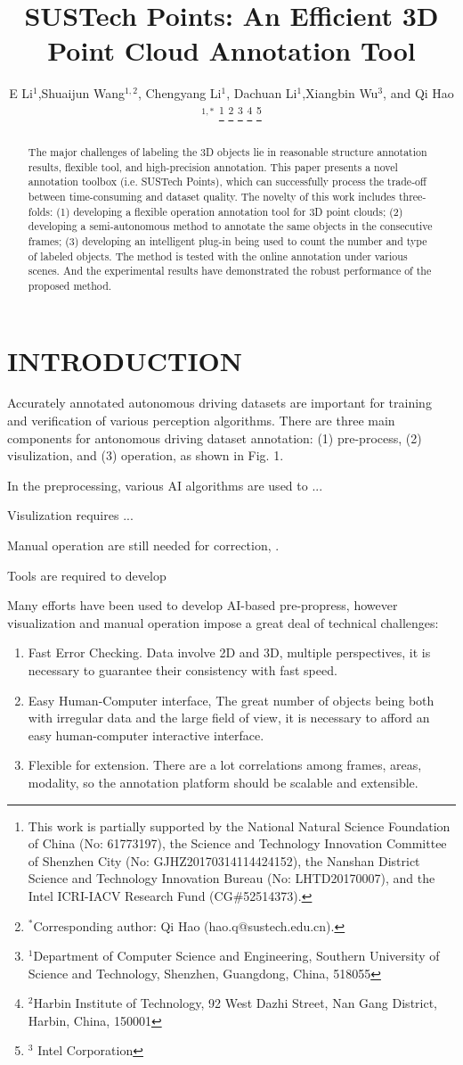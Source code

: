 \documentclass[letterpaper, 10 pt, conference]{ieeeconf}  %
\title{\LARGE \bf
SUSTech Points: An Efficient 3D Point Cloud Annotation Tool
}
\author{E Li$^{1}$,Shuaijun Wang$^{1,2}$,  Chengyang Li$^{1}$, Dachuan Li$^{1}$,Xiangbin Wu$^{3}$, and Qi Hao$^{1,*}$%
\thanks{This work is partially supported by the National Natural Science Foundation of China (No: 61773197), the Science and Technology Innovation Committee of Shenzhen City (No: GJHZ20170314114424152), the Nanshan District Science and Technology Innovation Bureau (No: LHTD20170007), and the Intel ICRI-IACV Research Fund (CG$\#$52514373).}
\thanks{$^{*}$Corresponding author: Qi Hao (hao.q@sustech.edu.cn).}
\thanks{$^{1}$Department of Computer Science and Engineering,
Southern University of Science and Technology, Shenzhen, Guangdong, China, 518055}
\thanks{$^{2}$Harbin Institute of Technology,
92 West Dazhi Street, Nan Gang District, Harbin, China, 150001}%
\thanks{$^{3}$ Intel Corporation}%
}
\begin{document}
\maketitle
\thispagestyle{empty}
\pagestyle{empty}
\begin{abstract}
The major challenges of labeling the 3D objects lie in reasonable structure annotation results, flexible tool, and high-precision annotation. This paper presents a novel annotation toolbox (i.e. SUSTech Points), which can successfully process the trade-off between time-consuming and dataset quality. The novelty of this work includes three-folds: (1) developing a flexible operation annotation tool for 3D point clouds; (2) developing a semi-autonomous method to annotate the same objects in the consecutive frames; (3) developing an intelligent plug-in being used to count the number and type of labeled objects. The method is tested with the online annotation under various scenes. And the experimental results have demonstrated the robust performance of the proposed method.
\end{abstract}






\section{INTRODUCTION}

Accurately annotated autonomous driving datasets are important for training and verification of various perception algorithms.
There are three main components for antonomous driving dataset annotation: (1) pre-process, (2) visulization, and (3) operation, as shown in Fig. 1.

In the preprocessing, various AI algorithms are used to ...

Visulization requires ...

Manual operation are still needed for correction, . 


Tools are required to develop 


Many efforts have been used to develop AI-based pre-propress, however
visualization and manual operation impose a great deal of technical challenges:
\begin{enumerate}
\item  Fast Error Checking. Data involve 2D and 3D, multiple perspectives, it is necessary to guarantee their consistency with fast speed.
\item  Easy Human-Computer interface, The great number of objects being both with irregular data and the large field of view, it is necessary to afford an easy human-computer interactive interface. 
\item  Flexible for extension. There are a lot correlations among frames, areas, modality, so the annotation platform should be scalable and extensible.
\end{enumerate}
\end{document}
